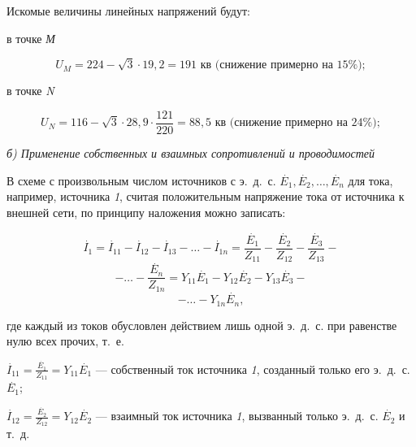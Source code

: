 \begin{small}
	Искомые величины линейных напряжений будут:
	
	в точке \textit{М}
	
	\begin{equation*}
		U_M = 224 - \sqrt{3} \cdot 19,2 = 191 \textit{~кв} \text{ (снижение примерно на 15\%)};
	\end{equation*}	

	в точке \textit{N}
	
	\begin{equation*}
		U_N = 116 - \sqrt{3} \cdot 28,9 \cdot \frac{121}{220} = 88,5 \textit{~кв} \text{ (снижение примерно на 24\%)};
	\end{equation*}		

\end{small}


\vspace{1pc}
\textit{б) Применение собственных и взаимных сопротивлений и проводимостей }

В схеме с произвольным числом источников с э.~д.~с. $ \overset{~.}{E}_1, \overset{~.}{E}_2, \ldots, \overset{~.}{E}_n $ для тока, например, источника \textit{1}, считая положительным напряжение тока от источника к внешней сети, по принципу наложения можно записать:

\begin{equation*}
	\overset{~.}{I}_1 = \overset{~.}{I}_{11} - \overset{~.}{I}_{12} - \overset{~.}{I}_{13} - \ldots - \overset{~.}{I}_{1n} = \frac{\overset{~.}{E}_{1}}{Z_{11}} - \frac{\overset{~.}{E}_{2}}{Z_{12}} - \frac{\overset{~.}{E}_{3}}{Z_{13}} -
\end{equation*}	
\begin{equation*}
	- \ldots - \frac{\overset{~.}{E}_{n}}{Z_{1n}} = Y_{11}\overset{~.}{E}_1 - Y_{12}\overset{~.}{E}_2 - Y_{13}\overset{~.}{E}_3 - 
\end{equation*}	
\begin{equation}
	- \ldots - Y_{1n}\overset{~.}{E}_n, 
	\label{eq:2-35 summa_tokov}
\end{equation}

где каждый из токов обусловлен действием лишь одной э.~д.~с. при равенстве нулю всех прочих, т.~е.

$ \overset{~.}{I}_{11} = \frac{\overset{~.}{E}_1}{Z_{11}} = Y_{11}\overset{~.}{E}_1 $ --- собственный ток источника \textit{1}, созданный только его э.~д.~с. $ \overset{~.}{E}_1 $;

$ \overset{~.}{I}_{12} = \frac{\overset{~.}{E}_2}{Z_{12}} = Y_{12}\overset{~.}{E}_2 $ --- взаимный ток источника \textit{1}, вызванный только э.~д.~с. $ \overset{~.}{E}_2 $ и т.~д.

